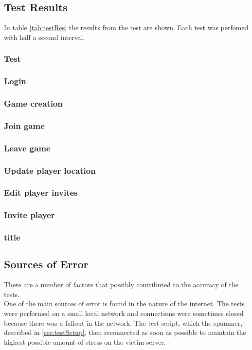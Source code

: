 \subsection{Test Results}
In table \cref{tab:testRes} the results from the test are shown. Each test was perfomed with half a second interval.

\subsubsection{Test}
\subsubsection{Login}
\subsubsection{Game creation}
\subsubsection{Join game}
\subsubsection{Leave game}
\subsubsection{Update player location}
\subsubsection{Edit player invites}
\subsubsection{Invite player}
\subsubsection{title}

\subsection{Sources of Error}
There are a number of factors that possibly contributed to the accuracy of the tests.\\

One of the main sources of error is found in the nature of the internet. The tests were performed on a small local network and connections were sometimes closed because there was a fallout in the network. The test script, which the spammer, described in \cref{sec:testSetup}, then reconnected as soon as possible to maintain the highest possible amount of stress on the victim server. 